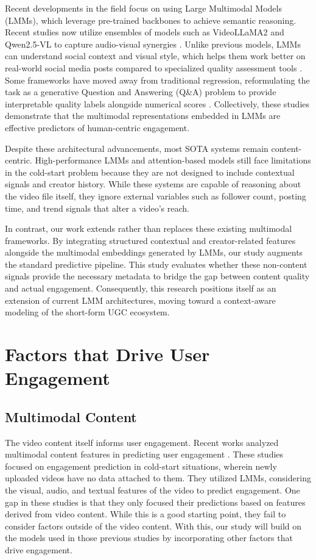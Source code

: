 Recent developments in the field focus on using Large Multimodal Models (LMMs), which leverage pre-trained backbones to achieve semantic reasoning. Recent studies now utilize ensembles of models such as VideoLLaMA2 and Qwen2.5-VL to capture audio-visual synergies \cite{sun2025engagement}. Unlike previous models, LMMs can understand social context and visual style, which helps them work better on real-world social media posts compared to specialized quality assessment tools \cite{ge2025lmm}. Some frameworks have moved away from traditional regression, reformulating the task as a generative Question and Answering (Q\&A) problem to provide interpretable quality labels alongside numerical scores \cite{ge2025lmm}. Collectively, these studies demonstrate that the multimodal representations embedded in LMMs are effective predictors of human-centric engagement.

Despite these architectural advancements, most SOTA systems remain content-centric. High-performance LMMs and attention-based models still face limitations in the cold-start problem because they are not designed to include contextual signals and creator history. While these systems are capable of reasoning about the video file itself, they ignore external variables such as follower count, posting time, and trend signals that alter a video's reach.

In contrast, our work extends rather than replaces these existing multimodal frameworks. By integrating structured contextual and creator-related features alongside the multimodal embeddings generated by LMMs, our study augments the standard predictive pipeline. This study evaluates whether these non-content signals provide the necessary metadata to bridge the gap between content quality and actual engagement. Consequently, this research positions itself as an extension of current LMM architectures, moving toward a context-aware modeling of the short-form UGC ecosystem.

\section{Factors that Drive User Engagement}

\subsection{Multimodal Content}
The video content itself informs user engagement. Recent works analyzed multimodal content features in predicting user engagement \cite{guan2025mmf, li2024delving, sun2025engagement}. These studies focused on engagement prediction in cold-start situations, wherein newly uploaded videos have no data attached to them. They utilized LMMs, considering the visual, audio, and textual features of the video to predict engagement. One gap in these studies is that they only focused their predictions based on features derived from video content. While this is a good starting point, they fail to consider factors outside of the video content. With this, our study will build on the models used in those previous studies by incorporating other factors that drive engagement.

